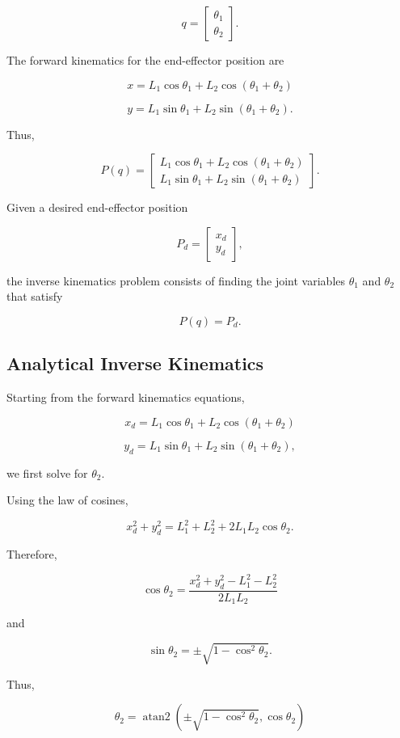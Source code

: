 \documentclass{article}
\begin{document}
\[
q =
\begin{bmatrix}
\theta_1\\
\theta_2
\end{bmatrix}.
\]

The forward kinematics for the end-effector position are

\[
x =
L_1\cos\theta_1
+
L_2\cos(\theta_1+\theta_2)
\]

\[
y =
L_1\sin\theta_1
+
L_2\sin(\theta_1+\theta_2).
\]

Thus,

\[
P(q) =
\begin{bmatrix}
L_1\cos\theta_1 + L_2\cos(\theta_1+\theta_2)\\
L_1\sin\theta_1 + L_2\sin(\theta_1+\theta_2)
\end{bmatrix}.
\]

Given a desired end-effector position

\[
P_d =
\begin{bmatrix}
x_d\\
y_d
\end{bmatrix},
\]

the inverse kinematics problem consists of finding the joint
variables $\theta_1$ and $\theta_2$ that satisfy

\[
P(q) = P_d.
\]


\subsection{Analytical Inverse Kinematics}

Starting from the forward kinematics equations,

\[
x_d =
L_1\cos\theta_1
+
L_2\cos(\theta_1+\theta_2)
\]

\[
y_d =
L_1\sin\theta_1
+
L_2\sin(\theta_1+\theta_2),
\]

we first solve for $\theta_2$.

Using the law of cosines,

\[
x_d^2+y_d^2
=
L_1^2+L_2^2
+
2L_1L_2\cos\theta_2.
\]

Therefore,

\[
\boxed{
\cos\theta_2
=
\frac{x_d^2+y_d^2-L_1^2-L_2^2}
{2L_1L_2}
}
\]

and

\[
\sin\theta_2
=
\pm\sqrt{1-\cos^2\theta_2}.
\]

Thus,

\[
\boxed{
\theta_2
=
\operatorname{atan2}
\left(
\pm\sqrt{1-\cos^2\theta_2},
\cos\theta_2
\right)
}
\]
\end{document}
